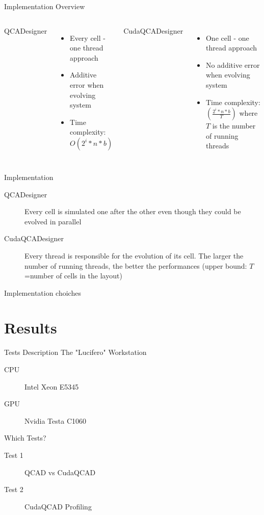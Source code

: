 \documentclass[10pt, red]{beamer}
\begin{document}
	\begin{frame}{Implementation Overview}
		\begin{columns}
			QCADesigner
			\begin{itemize}
				\item Every cell - one thread approach
				\item Additive error when evolving system
				\item Time complexity: $O(2^i*n*b)$
			\end{itemize}
			CudaQCADesigner
			\begin{itemize}
				\item One cell - one thread approach
				\item No additive error when evolving system
				\item Time complexity: $(\frac{2^i*n*b}{T})$ where $T$ is the number of running threads
			\end{itemize}
		\end{columns}
	\end{frame}

	\begin{frame}{Implementation}
		\begin{description}
			\item[QCADesigner] Every cell is simulated one after the other even though they could be evolved in parallel
			\item[CudaQCADesigner] Every thread is responsible for the evolution of its cell. The larger the number of running threads, the better the performances (upper bound: $T$=number of cells in the layout)
		\end{description}
	\end{frame}

	\begin{frame}{Implementation}
		choiches
	\end{frame}

\section{Results}

	\begin{frame}{Tests Description}
		The "Lucifero" Workstation
		\begin{description}
			\item[CPU] Intel Xeon E5345
			\item[GPU] Nvidia Testa C1060
		\end{description}
		Which Tests?
		\begin{description}
			\item[Test 1] QCAD vs CudaQCAD
			\item[Test 2] CudaQCAD Profiling
		\end{description}
	\end{frame}
\end{document}
